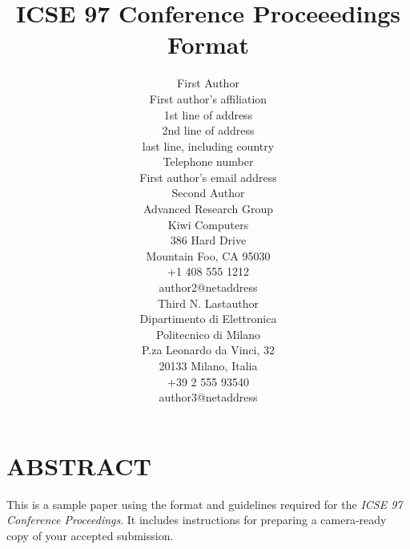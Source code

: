 


\title{ICSE 97 Conference Proceeedings Format}

\author{
        \hspace*{-2ex}
        \parbox{2.3in} {\begin{center}
	{\authornamefont First Author}\\ 
        First author's affiliation\\
        1st line of address\\
        2nd line of address\\
        last line, including country \\
	Telephone number\\
	First author's email address
	\end{center} }
        \parbox{2.3in} {\begin{center}
        {\authornamefont Second Author}\\
	Advanced Research Group\\
	Kiwi Computers\\
	386 Hard Drive\\
	Mountain Foo, CA  95030\\
	+1 408 555 1212\\
	author2@netaddress
	\end{center} }
        \parbox{2.3in} {\begin{center}
        {\authornamefont Third N. Lastauthor}\\
	Dipartimento di Elettronica\\
	Politecnico di Milano\\
	P.za Leonardo da Vinci, 32\\
	20133 Milano, Italia\\
	+39 2 555 93540\\
	author3@netaddress
	\end{center} }
}


\maketitle
\copyrightspace

\section{ABSTRACT}
This is a sample paper using the format and guidelines 
required for the {\it ICSE 97 Conference Proceedings}. It 
includes instructions for preparing a camera-ready copy of 
your accepted submission.

